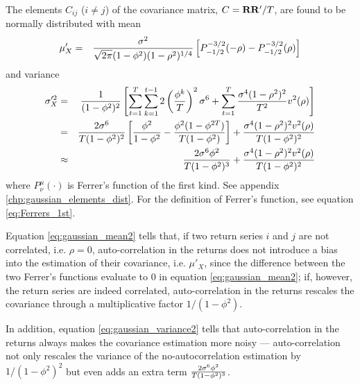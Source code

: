 The elements $C_{ij}$ ($i \neq j$) of the covariance matrix, $C
= \mathbf{RR'}/T$, are found to be normally distributed with mean
\begin{eqnarray}
  \mu'_X &=& {\sigma^2 \over \sqrt{2\pi} (1 - \phi^2)(1 -
    \rho^2)^{1/4}} \left[ P^{-3/2}_{-1/2}(-\rho) -
    P^{-3/2}_{-1/2}(\rho)
  \right] \label{eq:gaussian_mean2}
\end{eqnarray}
and variance
\begin{eqnarray}
  \sigma'^2_X &=& {1 \over (1 - \phi^2)^2}\left[
    \sum_{t=1}^T \sum_{k=1}^{t-1} 2\left(
      \phi^k \over T
    \right)^2 \sigma^6 + \sum_{t=1}^T
    {\sigma^4 (1 - \rho^2)^2 \over T^2} v^2(\rho)
  \right] \nonumber \\
  &=& {2 \sigma^6 \over T (1 - \phi^2)^2} \left[
    {\phi^2 \over 1 - \phi^2} -
    {\phi^2 (1 - \phi^{2T}) \over
      T(1 - \phi^2)}
  \right] + {\sigma^4 (1 - \rho^2)^2 v^2(\rho) \over
    T (1 - \phi^2)^2} \nonumber \\
  &\approx& {2 \sigma^6 \phi^2 \over T (1 - \phi^2)^3}
  + {\sigma^4 (1 - \rho^2)^2 v^2(\rho) \over
    T (1 - \phi^2)^2} \label{eq:gaussian_variance2}
\end{eqnarray}
where $P^\mu_\nu(\cdot)$ is Ferrer's function of the first
kind. See appendix \ref{chp:gaussian_elements_dist}. For the
definition of Ferrer's function, see equation
\ref{eq:Ferrers_1st}.

Equation \ref{eq:gaussian_mean2} tells that, if
two return series $i$ and $j$ are not correlated, i.e. $\rho = 0$,
auto-correlation in the returns does not introduce a bias into the
estimation of their covariance, i.e. $\mu'_X$, since the difference
between the two Ferrer's functions evaluate to 0 in equation
\ref{eq:gaussian_mean2}; if, however, the return series are indeed
correlated, auto-correlation in the returns rescales the
covariance through a multiplicative factor $1/(1 - \phi^2)$.

In addition, equation \ref{eq:gaussian_variance2} tells that
auto-correlation in the returns always makes the covariance
estimation more noisy --- auto-correlation not only rescales the
variance of the no-autocorrelation estimation by $1/(1 - \phi^2)^2$
but even adds an extra term ${2 \sigma^6 \phi^2 \over T (1 -
  \phi^2)^3}$.

